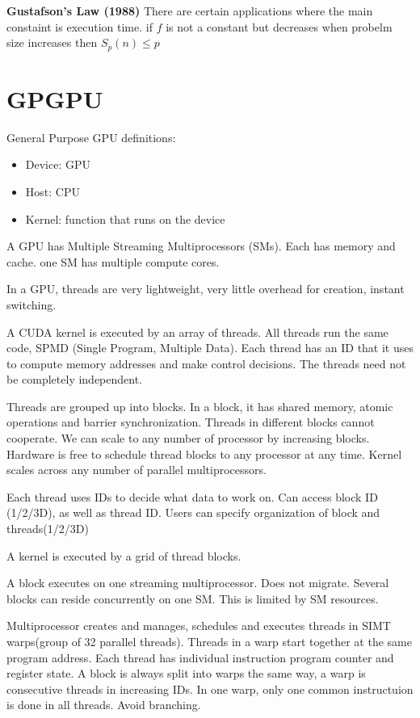 \documentclass{article}
\begin{document}
\textbf{Gustafson's Law (1988)}
There are certain applications where the main constaint is execution time.
if $f$ is not a constant but decreases when probelm size increases then $S_p \left( n \right) \leq p$

\section{GPGPU}
General Purpose GPU definitions:
\begin{itemize}
    \item Device: GPU
    \item Host: CPU
    \item Kernel: function that runs on the device
\end{itemize}
A GPU has Multiple Streaming Multiprocessors (SMs).
Each has memory and cache. one SM has multiple compute cores.

In a GPU, threads are very lightweight, very little overhead for creation, instant switching.


A CUDA kernel is executed by an array of threads. All threads run the same code, SPMD (Single Program, Multiple Data).
Each thread has an ID that it uses to compute memory addresses and make control decisions.
The threads need not be completely independent.

Threads are grouped up into blocks.
In a block, it has shared memory, atomic operations and barrier synchronization.
Threads in different blocks cannot cooperate.
We can scale to any number of processor by increasing blocks.
Hardware is free to schedule thread blocks to any processor at any time.
Kernel scales across any number of parallel multiprocessors.

Each thread uses IDs to decide what data to work on.
Can access block ID (1/2/3D), as well as thread ID.
Users can specify organization of block and threads(1/2/3D)

A kernel is executed by a grid of thread blocks.

A block executes on one streaming multiprocessor.
Does not migrate.
Several blocks can reside concurrently on one SM.
This is limited by SM resources.

Multiprocessor creates and manages, schedules and executes threads in SIMT warps(group of 32 parallel threads).
Threads in a warp start together at the same program address. Each thread has individual instruction program counter and register state.
A block is always split into warps the same way, a warp is consecutive threads in increasing IDs.
In one warp, only one common instructuion is done in all threads.
Avoid branching.
\end{document}
